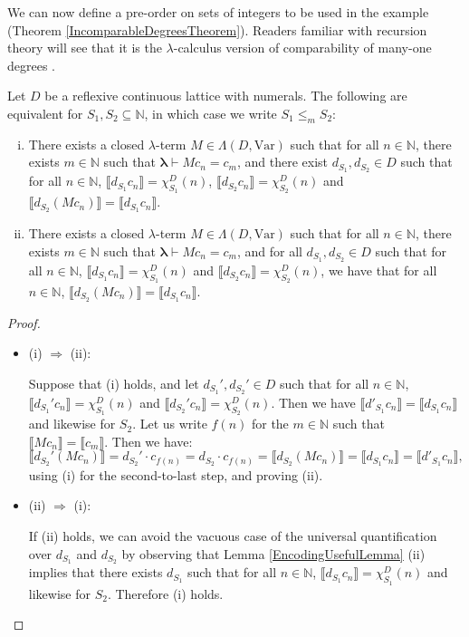 \documentclass{lmcs}
\newcommand{\sembrack}[1]{\llbracket{#1}\rrbracket}
\newcommand{\Var}{\ensuremath{\mathrm{Var}}}
\newcommand{\N}{\ensuremath{\mathbb{N}}}
\newcommand{\lamth}{\boldsymbol{\lambda}} %
\begin{document}
We can now define a pre-order on sets of integers to be used in the example (Theorem \ref{IncomparableDegreesTheorem}). Readers familiar with recursion theory will see that it is the $\lambda$-calculus version of comparability of many-one degrees \cite[Definition 4.8 (i), (iii)]{soare}. 
\begin{prop}
\label{ManyOneAltDefsProp}
Let $D$ be a reflexive continuous lattice with numerals. The following are equivalent for $S_1,S_2 \subseteq \N$, in which case we write $S_1 \leq_m S_2$:
\begin{enumerate}[(i)]
\item There exists a closed $\lambda$-term $M \in \Lambda(D,\Var)$ such that for all $n \in \N$, there exists $m \in \N$ such that $\lamth \vdash M c_n = c_m$, and there exist $d_{S_1}, d_{S_2} \in D$ such that for all $n \in \N$, $\sembrack{d_{S_1} c_n} = \chi_{S_1}^D(n)$, $\sembrack{d_{S_2} c_n} = \chi_{S_2}^D(n)$ and $\sembrack{d_{S_2} (M c_n)} = \sembrack{d_{S_1} c_n}$. 
\item There exists a closed $\lambda$-term $M \in \Lambda(D,\Var)$ such that for all $n \in \N$, there exists $m \in \N$ such that $\lamth \vdash M c_n = c_m$, and for all $d_{S_1},d_{S_2} \in D$ such that for all $n \in \N$, $\sembrack{d_{S_1} c_n} = \chi_{S_1}^D(n)$ and $\sembrack{d_{S_2} c_n} = \chi_{S_2}^D(n)$, we have that for all $n \in \N$, $\sembrack{d_{S_2} (M c_n)} = \sembrack{d_{S_1} c_n}$. 
\end{enumerate}
\end{prop}
\begin{proof}
\begin{itemize}
\item (i) $\Rightarrow$ (ii):
		
Suppose that (i) holds, and let $d_{S_1}',d_{S_2}' \in D$ such that for all $n \in \N$, $\sembrack{d_{S_1}' c_n} = \chi_{S_1}^D(n)$ and $\sembrack{d_{S_2}'c_n} = \chi_{S_2}^D(n)$. Then we have $\sembrack{d'_{S_1}c_n} = \sembrack{d_{S_1}c_n}$ and likewise for $S_2$. Let us write $f(n)$ for the $m \in \N$ such that $\sembrack{Mc_n} = \sembrack{c_m}$. Then we have:
\[
\sembrack{d_{S_2}'(Mc_n)} = d_{S_2}' \cdot c_{f(n)} = d_{S_2} \cdot c_{f(n)} = \sembrack{d_{S_2} (Mc_n)} = \sembrack{d_{S_1}c_n} = \sembrack{d'_{S_1}c_n},
\]
using (i) for the second-to-last step, and proving (ii). 
\item (ii) $\Rightarrow$ (i):
		
If (ii) holds, we can avoid the vacuous case of the universal quantification over $d_{S_1}$ and $d_{S_2}$ by observing that Lemma \ref{EncodingUsefulLemma} (ii) implies that there exists $d_{S_1}$ such that for all $n \in \N$, $\sembrack{d_{S_1}c_n} = \chi^D_{S_1}(n)$ and likewise for $S_2$. Therefore (i) holds.
\end{itemize}
\end{proof}
\end{document}
